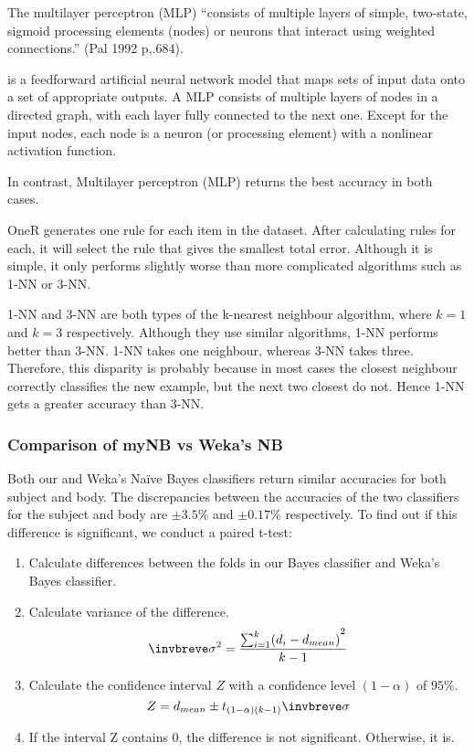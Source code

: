 \documentclass[10pt, a4paper]{article}
\begin{document}
The multilayer perceptron (MLP) ``consists of multiple layers of simple, two-state, sigmoid processing elements (nodes) or neurons that interact using weighted connections.'' (Pal 1992 p,.684).  

is a feedforward artificial neural network model that maps sets of input data onto a set of appropriate outputs. A MLP consists of multiple layers of nodes in a directed graph, with each layer fully connected to the next one. Except for the input nodes, each node is a neuron (or processing element) with a nonlinear activation function.




In contrast, Multilayer perceptron (MLP) returns the best accuracy in both cases.

OneR generates one rule for each item in the dataset. After calculating rules for each, it will select the rule that gives the smallest total error. Although it is simple, it only performs slightly worse than more complicated algorithms such as 1-NN or 3-NN.

1-NN and 3-NN are both types of the k-nearest neighbour algorithm, where $k = 1$ and $k = 3$ respectively. Although they use similar algorithms, 1-NN performs better than 3-NN. 1-NN takes one neighbour, whereas 3-NN takes three. Therefore, this disparity is probably because in most cases the closest neighbour correctly classifies the new example, but the next two closest do not. Hence 1-NN gets a greater accuracy than 3-NN.

\subsubsection{Comparison of myNB vs Weka's NB}

Both our and Weka's Na\"ive Bayes classifiers return similar accuracies for both subject and body. The discrepancies between the accuracies of the two classifiers for the subject and body are $\pm 3.5\%$ and $\pm 0.17\%$ respectively. To find out if this difference is significant, we conduct a paired t-test:

\begin{enumerate}
\item Calculate differences between the folds in our Bayes classifier and Weka's Bayes classifier.
\item Calculate variance of the difference.
$$ \invbreve\sigma ^{2} = \frac{ {\sum\nolimits_{i=1}^k (d_{i}-d_{mean})}^2 }{k-1} $$
\item Calculate the confidence interval $Z$ with a confidence level $(1-\alpha)$ of $95\%$.
$$ Z = d_{mean} \pm t_{(1-\alpha)(k-1)} \invbreve\sigma $$
\item If the interval Z contains 0, the difference is not significant. Otherwise, it is.
\end{enumerate}
\end{document}
